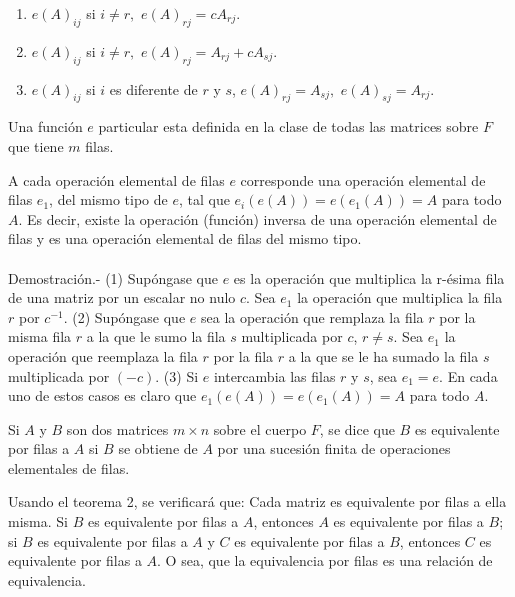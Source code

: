     \begin{enumerate}[\bfseries 1.]
	\item $e(A)_{ij}$ si $i\neq r,$ $e(A)_{rj}=cA_{rj}$.
	\item $e(A)_{ij}$ si $i\neq r,$ $e(A)_{rj}=A_{rj}+cA_{sj}.$
	\item $e(A)_{ij}$ si $i$ es diferente de $r$ y $s$, $e(A)_{rj}=A_{sj},$ $e(A)_{sj}=A_{rj}.$
    \end{enumerate}

    Una función $e$ particular esta definida en la clase de todas las matrices sobre $F$ que tiene $m$ filas.

\begin{teo}
    A cada operación elemental de filas $e$ corresponde una operación elemental de filas $e_1$, del mismo tipo de $e$, tal que $e_i(e(A))=e(e_1(A))=A$ para todo $A$. Es decir, existe la operación (función) inversa de una operación elemental de filas y es una operación elemental de filas del mismo tipo.\\\\
    Demostración.-\; (1) Supóngase que $e$ es la operación que multiplica la r-ésima fila de una matriz por un escalar no nulo $c$. Sea $e_1$ la operación que multiplica la fila $r$ por $c^{-1}$. (2) Supóngase que $e$ sea la operación que remplaza la fila $r$ por la misma fila $r$ a la que le sumo la fila $s$ multiplicada por $c$, $r\neq s$. Sea $e_1$ la operación que reemplaza la fila $r$ por la fila $r$ a la que se le ha sumado la fila $s$ multiplicada por $(-c)$. (3) Si $e$ intercambia las filas $r$ y $s$, sea $e_1=e$. En cada uno de estos casos es claro que $e_1(e(A))=e(e_1(A))=A$ para todo $A$.
\end{teo}

    \begin{def.}
	Si $A$ y $B$ son dos matrices $m\times n$ sobre el cuerpo $F$, se dice que $B$ es equivalente por filas a $A$ si $B$ se obtiene de $A$ por una sucesión finita de operaciones elementales de filas.
    \end{def.}

Usando el teorema 2, se verificará que: Cada matriz es equivalente por filas a ella misma. Si $B$ es equivalente por filas a $A$, entonces $A$ es equivalente por filas a $B$; si $B$ es equivalente por filas a $A$ y $C$ es equivalente por filas a $B$, entonces $C$ es equivalente por filas a $A$. O sea, que la equivalencia por filas es una relación de equivalencia.

